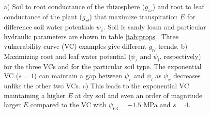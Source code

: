 \documentclass[utf8]{frontiersSCNS} %
\begin{document}
\begin{figure}[h]
    \caption{a) Soil to root conductance of the rhizosphere ($g_{sr}$) and root to leaf conductance of the plant ($g_{rl}$) that maximize transpiration $E$ for difference soil water potentials $\psi_x$. Soil is sandy loam and particular hydraulic parameters are shown in table \ref{tab:props}. Three vulnerability curve (VC) examples give different $g_{rl}$ trends. b) Maximizing root and leaf water potential ($\psi_r$ and $\psi_l$, respectively) for the three VCs and for the particular soil type. The exponential VC ($s=1$) can maintain a gap between $\psi_r$ and $\psi_l$ as $\psi_x$ decreases unlike the other two VCs. c) This leads to the exponential VC maintaining a higher $E$ at dry soil and even an order of magnitude larger $E$ compared to the VC with $\psi_{63}=-1.5$ MPa and $s=4$.}
    \label{fig:gmax_Emax_psix}
\end{figure}
\end{document}
